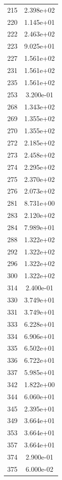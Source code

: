 \documentclass[12pt]{article}
\begin{document}
\begin{longtable}{@{}cc@{}}
215 & 2.398e+02 \\
220 & 1.145e+01 \\
222 & 2.463e+02 \\
223 & 9.025e+01 \\
227 & 1.561e+02 \\
231 & 1.561e+02 \\
235 & 1.561e+02 \\
253 & 3.200e-01 \\
268 & 1.343e+02 \\
269 & 1.355e+02 \\
270 & 1.355e+02 \\
272 & 2.185e+02 \\
273 & 2.458e+02 \\
274 & 2.295e+02 \\
275 & 2.370e+02 \\
276 & 2.073e+02 \\
281 & 8.731e+00 \\
283 & 2.120e+02 \\
284 & 7.989e+01 \\
288 & 1.322e+02 \\
292 & 1.322e+02 \\
296 & 1.322e+02 \\
300 & 1.322e+02 \\
314 & 2.400e-01 \\
330 & 3.749e+01 \\
331 & 3.749e+01 \\
333 & 6.228e+01 \\
334 & 6.906e+01 \\
335 & 6.502e+01 \\
336 & 6.722e+01 \\
337 & 5.985e+01 \\
342 & 1.822e+00 \\
344 & 6.060e+01 \\
345 & 2.395e+01 \\
349 & 3.664e+01 \\
353 & 3.664e+01 \\
357 & 3.664e+01 \\
374 & 2.900e-01 \\
375 & 6.000e-02 \\

\bottomrule
\end{longtable}
\end{document}
